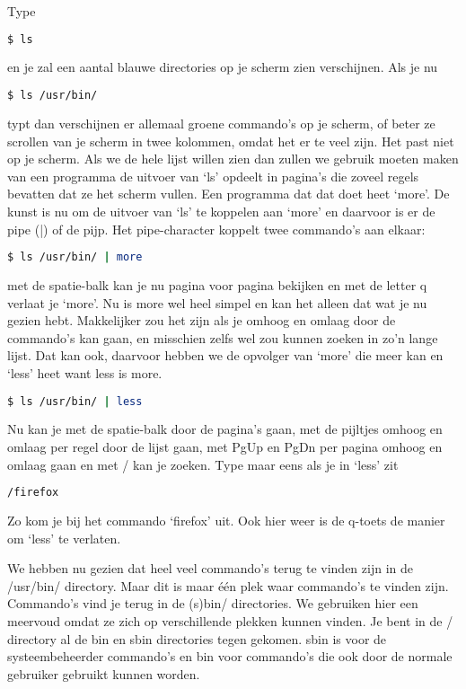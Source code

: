 Type
\begin{lstlisting}[language=bash]
$ ls
\end{lstlisting}
en je zal een aantal blauwe directories op je scherm zien verschijnen. Als je nu
\begin{lstlisting}[language=bash]
$ ls /usr/bin/
\end{lstlisting}
typt dan verschijnen er allemaal groene commando's op je scherm, of beter ze scrollen van je scherm in twee kolommen,
omdat het er te veel zijn. Het past niet op je scherm. Als we de hele lijst willen zien dan zullen we gebruik moeten
maken van een programma de uitvoer van `ls' opdeelt in pagina's die zoveel regels bevatten dat ze het scherm vullen.
Een programma dat dat doet heet `more'. De kunst is nu om de uitvoer van `ls' te koppelen aan `more' en daarvoor is er
de pipe (|) of de pijp. Het pipe-character koppelt twee commando's aan elkaar:
\begin{lstlisting}[language=bash]
$ ls /usr/bin/ | more
\end{lstlisting}
met de spatie-balk kan je nu pagina voor pagina bekijken en met de letter q verlaat je `more'. Nu is more wel heel
simpel en kan het alleen dat wat je nu gezien hebt. Makkelijker zou het zijn als je omhoog en omlaag door de commando's
kan gaan, en misschien zelfs wel zou kunnen zoeken in zo'n lange lijst. Dat kan ook, daarvoor hebben we de opvolger van
`more' die meer kan en `less' heet want less is more.

\begin{lstlisting}[language=bash]
$ ls /usr/bin/ | less
\end{lstlisting}
Nu kan je met de spatie-balk door de pagina's gaan, met de pijltjes omhoog en omlaag per regel door de lijst gaan, met
PgUp en PgDn per pagina omhoog en omlaag gaan en met / kan je zoeken. Type maar eens als je in `less' zit
\begin{lstlisting}[language=bash]
/firefox
\end{lstlisting}
Zo kom je bij het commando `firefox' uit. Ook hier weer is de q-toets de manier om `less' te verlaten.

We hebben nu gezien dat heel veel commando's terug te vinden zijn in de /usr/bin/ directory. Maar dit is maar \'e\'en
plek waar commando's te vinden zijn. Commando's vind je terug in de (s)bin/ directories. We
gebruiken hier een meervoud omdat ze zich op verschillende plekken kunnen vinden. Je bent in de / directory al de bin
en sbin directories tegen gekomen. sbin is voor de systeembeheerder commando's en bin voor
commando's die ook door de normale gebruiker gebruikt kunnen worden.

